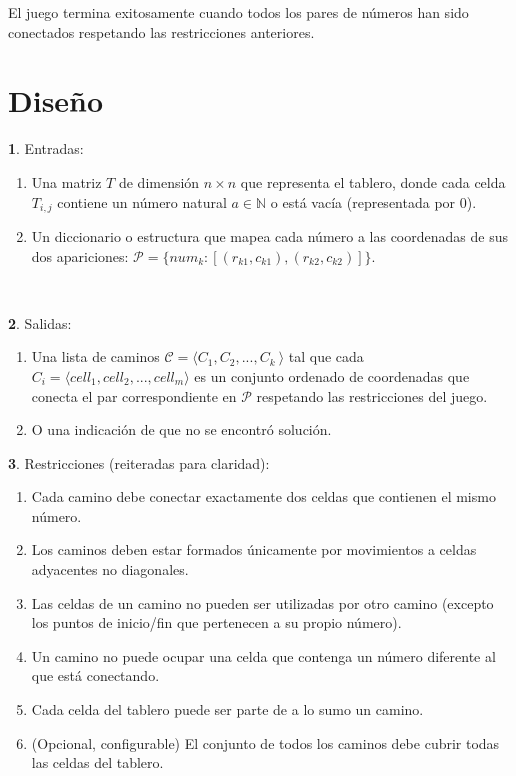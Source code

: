 \documentclass[spanish]{article}
\numberwithin{equation}{section}
\numberwithin{figure}{section}
\theoremstyle{definition}
\newtheorem*{defn*}{\protect\definitionname}
\providecommand{\definitionname}{Definition}
\begin{document}
El juego termina exitosamente cuando todos los pares de números han sido conectados respetando las restricciones anteriores.

\section{Diseño}

\begin{defn*}
    Entradas:
\end{defn*}
%
\begin{enumerate}
    \item Una matriz $T$ de dimensión $n \times n$ que representa el tablero, donde cada celda $T_{i,j}$ contiene un número natural $a \in \mathbb{N}$ o está vacía (representada por 0).
    \item Un diccionario o estructura que mapea cada número a las coordenadas de sus dos apariciones: $\mathcal{P} = \{num_k: [(r_{k1}, c_{k1}), (r_{k2}, c_{k2})] \}$.
\end{enumerate}
%
~~~~
\begin{defn*}
    Salidas:
\end{defn*}
\begin{enumerate}
    \item Una lista de caminos $\mathcal{C} = \langle C_1, C_2, ..., C_k\ \rangle $ tal que cada $C_i = \langle cell_1, cell_2, ..., cell_m \rangle$ es un conjunto ordenado de coordenadas que conecta el par correspondiente en $\mathcal{P}$ respetando las restricciones del juego.
    \item O una indicación de que no se encontró solución.
\end{enumerate}

\begin{defn*}
    Restricciones (reiteradas para claridad):
\end{defn*}
\begin{enumerate}
    \item Cada camino debe conectar exactamente dos celdas que contienen el mismo número.
    \item Los caminos deben estar formados únicamente por movimientos a celdas adyacentes no diagonales.
    \item Las celdas de un camino no pueden ser utilizadas por otro camino (excepto los puntos de inicio/fin que pertenecen a su propio número).
    \item Un camino no puede ocupar una celda que contenga un número diferente al que está conectando.
    \item Cada celda del tablero puede ser parte de a lo sumo un camino.
    \item (Opcional, configurable) El conjunto de todos los caminos debe cubrir todas las celdas del tablero.
\end{enumerate}
\end{document}
